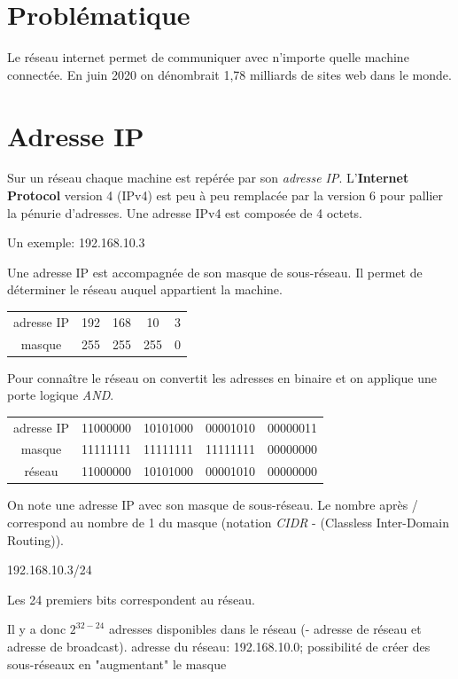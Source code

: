 \documentclass[a4paper,11pt]{article}
\begin{document}
\section{Problématique}
Le réseau internet permet de communiquer avec n'importe quelle machine connectée. En juin 2020 on dénombrait 1,78 milliards de sites web dans le monde.
\begin{center}
\end{center}
\section{Adresse IP}
Sur un réseau chaque machine est repérée par son \emph{adresse IP}. L'\textbf{Internet Protocol} version 4 (IPv4) est peu à peu remplacée par la version 6 pour pallier la pénurie d'adresses. Une adresse IPv4 est composée de 4 octets.
\begin{center}
    Un exemple: \large{192.168.10.3}
\end{center}
Une adresse IP est accompagnée de son masque de sous-réseau. Il permet de déterminer le réseau auquel appartient la machine.
\begin{center}
    \begin{tabular}{ccccc}
        adresse IP & 192 & 168 & 10  & 3 \\
        masque     & 255 & 255 & 255 & 0 \\
    \end{tabular}
\end{center}
Pour connaître le réseau on convertit les adresses en binaire et on applique une porte logique \emph{AND}.
\begin{center}
    \begin{tabular}{ccccc}
        adresse IP & 11000000 & 10101000 & 00001010 & 00000011 \\
        masque     & 11111111 & 11111111 & 11111111 & 00000000 \\
        réseau     & 11000000 & 10101000 & 00001010 & 00000000 \\
    \end{tabular}
\end{center}

\begin{aretenir}[]
    On note une adresse IP avec son masque de sous-réseau. Le nombre après / correspond au nombre de 1 du masque (notation \emph{CIDR} - (Classless Inter-Domain Routing)).
    \begin{center}
        192.168.10.3/24
    \end{center}
    Les 24 premiers bits correspondent au réseau.
    \begin{commentprof}
        Il y a donc $2^{32-24}$ adresses disponibles dans le réseau (- adresse de réseau et adresse de broadcast). adresse du réseau: 192.168.10.0; possibilité de créer des sous-réseaux en "augmentant" le masque
    \end{commentprof}
\end{aretenir}
\end{document}
